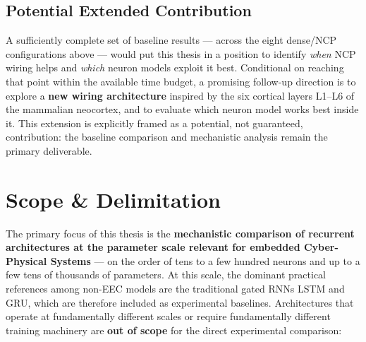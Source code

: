 \documentclass[11pt,a4paper]{article}
\begin{document}
\subsection*{Potential Extended Contribution}

A sufficiently complete set of baseline results --- across the eight dense/NCP configurations above --- would put this thesis in a position to identify \emph{when} NCP wiring helps and \emph{which} neuron models exploit it best. Conditional on reaching that point within the available time budget, a promising follow-up direction is to explore a \textbf{new wiring architecture} inspired by the six cortical layers L1--L6 of the mammalian neocortex, and to evaluate which neuron model works best inside it. This extension is explicitly framed as a potential, not guaranteed, contribution: the baseline comparison and mechanistic analysis remain the primary deliverable.

\newpage
\section*{Scope \& Delimitation}

The primary focus of this thesis is the \textbf{mechanistic comparison of recurrent architectures at the parameter scale relevant for embedded Cyber-Physical Systems} --- on the order of tens to a few hundred neurons and up to a few tens of thousands of parameters. At this scale, the dominant practical references among non-EEC models are the traditional gated RNNs LSTM and GRU, which are therefore included as experimental baselines. Architectures that operate at fundamentally different scales or require fundamentally different training machinery are \textbf{out of scope} for the direct experimental comparison:
\end{document}
